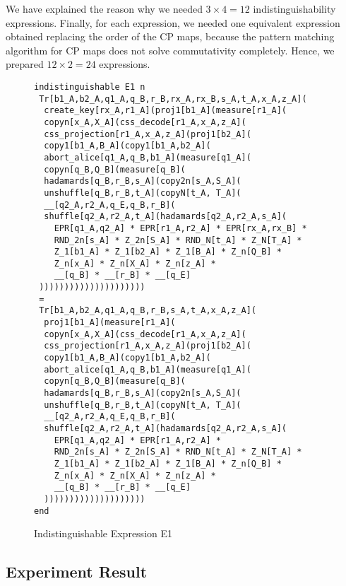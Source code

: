 We have explained the reason why we needed $3 \times 4 = 12$
indistinguishability expressions.
Finally, for each expression, we needed one equivalent expression
obtained replacing the order of the CP maps, because the pattern matching
algorithm for CP maps does not solve commutativity completely.
Hence, we prepared $12 \times 2 = 24$ expressions.
\begin{figure}
\begin{verbatim}
indistinguishable E1 n
 Tr[b1_A,b2_A,q1_A,q_B,r_B,rx_A,rx_B,s_A,t_A,x_A,z_A](
  create_key[rx_A,r1_A](proj1[b1_A](measure[r1_A](
  copyn[x_A,X_A](css_decode[r1_A,x_A,z_A](
  css_projection[r1_A,x_A,z_A](proj1[b2_A](
  copy1[b1_A,B_A](copy1[b1_A,b2_A](
  abort_alice[q1_A,q_B,b1_A](measure[q1_A](
  copyn[q_B,Q_B](measure[q_B](
  hadamards[q_B,r_B,s_A](copy2n[s_A,S_A](
  unshuffle[q_B,r_B,t_A](copyN[t_A, T_A](
  __[q2_A,r2_A,q_E,q_B,r_B](
  shuffle[q2_A,r2_A,t_A](hadamards[q2_A,r2_A,s_A](
    EPR[q1_A,q2_A] * EPR[r1_A,r2_A] * EPR[rx_A,rx_B] *
    RND_2n[s_A] * Z_2n[S_A] * RND_N[t_A] * Z_N[T_A] * 
    Z_1[b1_A] * Z_1[b2_A] * Z_1[B_A] * Z_n[Q_B] *
    Z_n[x_A] * Z_n[X_A] * Z_n[z_A] * 
    __[q_B] * __[r_B] * __[q_E]
 )))))))))))))))))))))
 =
 Tr[b1_A,b2_A,q1_A,q_B,r_B,s_A,t_A,x_A,z_A](
  proj1[b1_A](measure[r1_A](
  copyn[x_A,X_A](css_decode[r1_A,x_A,z_A](
  css_projection[r1_A,x_A,z_A](proj1[b2_A](
  copy1[b1_A,B_A](copy1[b1_A,b2_A](
  abort_alice[q1_A,q_B,b1_A](measure[q1_A](
  copyn[q_B,Q_B](measure[q_B](
  hadamards[q_B,r_B,s_A](copy2n[s_A,S_A](
  unshuffle[q_B,r_B,t_A](copyN[t_A, T_A](
  __[q2_A,r2_A,q_E,q_B,r_B](
  shuffle[q2_A,r2_A,t_A](hadamards[q2_A,r2_A,s_A](
    EPR[q1_A,q2_A] * EPR[r1_A,r2_A] * 
    RND_2n[s_A] * Z_2n[S_A] * RND_N[t_A] * Z_N[T_A] * 
    Z_1[b1_A] * Z_1[b2_A] * Z_1[B_A] * Z_n[Q_B] *
    Z_n[x_A] * Z_n[X_A] * Z_n[z_A] *
    __[q_B] * __[r_B] * __[q_E]
  ))))))))))))))))))))
end
\end{verbatim}
\label{fml:indexp}
\caption{Indistinguishable Expression E1}
\end{figure}
\subsection{Experiment Result}
